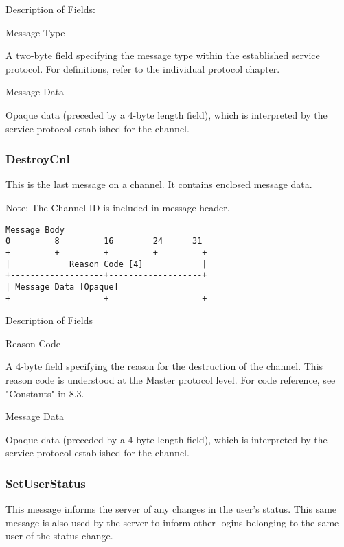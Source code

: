 \documentclass[titlepage,oneside]{book}
\begin{document}
\par{} Description of Fields:

\par{} Message Type

\subpar{}  A two-byte field specifying the message type within the established
  service protocol. For definitions, refer to the individual protocol
  chapter.

\par{} Message Data

\subpar{}  Opaque data (preceded by a 4-byte length field), which is
  interpreted by the service protocol established for the channel.

\subsubsection{DestroyCnl}

\par{} This is the last message on a channel. It contains enclosed message
data.

\par{} Note: The Channel ID is included in message header.

\begin{verbatim}
Message Body
0         8         16        24      31
+---------+---------+---------+---------+
|            Reason Code [4]            |
+-------------------+-------------------+
| Message Data [Opaque]
+-------------------+-------------------+
\end{verbatim}

\par{} Description of Fields

\par{} Reason Code

\subpar{}  A 4-byte field specifying the reason for the destruction of the
  channel. This reason code is understood at the Master protocol level.
  For code reference, see "Constants" in 8.3.

\par{} Message Data

\subpar{}  Opaque data (preceded by a 4-byte length field), which is
  interpreted by the service protocol established for the channel.

\subsubsection{SetUserStatus}

\par{} This message informs the server of any changes in the user's status.
This same message is also used by the server to inform other logins
belonging to the same user of the status change.
\end{document}
